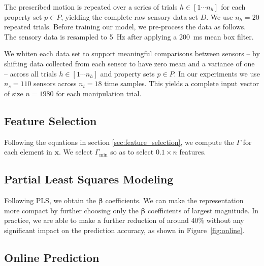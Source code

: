 The prescribed motion is repeated over a series of trials $h \in [1\cdots n_h]$ for each property set $p \in P$, yielding the complete raw sensory data set $D$. 
We use $n_h=20$ repeated trials.
Before training our model, we pre-process the data as follows.
The sensory data is resampled to 5~Hz after applying a 200~ms mean box filter. 

We whiten each data set to support meaningful comparisons between sensors -- by shifting data collected from each sensor to have zero mean and a variance of one -- across all trials $h \in [1 \cdots n_h]$ and property sets $p \in P$.  
In our experiments we use $n_s=110$ sensors across $n_t=18$ time samples.
This yields a complete input vector of size $n = 1980$ for each manipulation trial.

\subsection{Feature Selection}

Following the equations in section \ref{sec:feature_selection}, we compute the $\Gamma$ for each element in $\mathbf{x}$.
We select $\Gamma_{\min}$ so as to select $0.1 \times n$ features.%

\subsection{Partial Least Squares Modeling}
Following PLS, we obtain the $\mathbf{\beta}$ coefficients.
We can make the representation more compact by further choosing only the $\mathbf{\beta}$ coefficients of largest magnitude.
In practice, we are able to make a further reduction of around 40\% without any significant impact on the prediction accuracy, as shown in Figure~\ref{fig:online}.

\subsection{Online Prediction}

